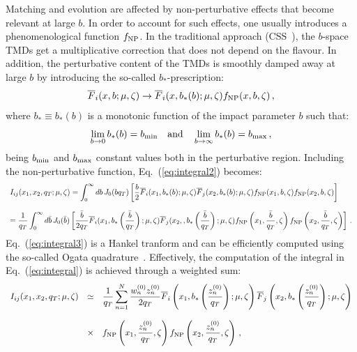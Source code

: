 \documentclass[10pt,a4paper]{article}
\begin{document}
Matching and evolution are affected by non-perturbative effects that
become relevant at large $b$. In order to account for such effects,
one usually introduces a phenomenological function $f_{\rm NP}$. In
the traditional approach (CSS~\cite{Collins:2011zzd}), the $b$-space
TMDs get a multiplicative correction that does not depend on the
flavour. In addition, the perturbative content of the TMDs is smoothly
damped away at large $b$ by introducing the so-called
$b_*$-prescription:
\begin{equation}\label{eq:LOconvNP1}
  \overline{F}_i(x,b;\mu,\zeta) \rightarrow \overline{F}_i(x,b_*(b);\mu,\zeta) f_{\rm NP}(x,b,\zeta)\,,
\end{equation}
where $b_*\equiv b_*(b)$ is a monotonic function of the impact
parameter $b$ such that:
\begin{equation}
  \lim_{b\rightarrow 0}
  b_*(b) = b_{\rm min}\quad\mbox{and}\quad\lim_{b\rightarrow \infty}
  b_*(b) = b_{\rm max}\,,
\end{equation}
being $b_{\rm min}$ and $b_{\rm max}$ constant values both in the
perturbative region. Including the non-perturbative function,
Eq.~(\ref{eq:integral2}) becomes:
\begin{equation}\label{eq:integral3}
\begin{array}{l}
\displaystyle I_{ij}(x_1,x_2,q_T;\mu,\zeta) = \displaystyle \int_0^\infty db\,J_0(bq_T)\left[\frac{b}2 
\overline{F}_i(x_1,b_*(b);\mu,\zeta) \overline{F}_{j}(x_2,b_*(b);\mu,\zeta) f_{\rm NP}(x_1,b,\zeta)
  f_{\rm NP}(x_2,b,\zeta) \right]\\
\\
\displaystyle =\frac{1}{q_T}\int_0^\infty d\bar{b}\,J_0(\bar{b})\left[\frac{\bar{b}}{2q_T} 
\overline{F}_i(x_1,b_*\left(\frac{\bar{b}}{q_T}\right);\mu,\zeta) \overline{F}_{j}(x_2,,b_*\left(\frac{\bar{b}}{q_T}\right);\mu,\zeta) f_{\rm NP}\left(x_1,\frac{\bar{b}}{q_T},\zeta\right)
  f_{\rm NP}\left(x_2,\frac{\bar{b}}{q_T},\zeta\right) \right]
\,.
\end{array}
\end{equation}
Eq.~(\ref{eq:integral3}) is a Hankel tranform and can be efficiently
computed using the so-called Ogata quadrature~\cite{Ogata:quadrature}.
Effectively, the computation of the integral in
Eq.~(\ref{eq:integral}) is achieved through a weighted sum:
\begin{equation}\label{eq:ogataquadrature}
\begin{array}{rcl}
I_{ij}(x_1,x_2,q_T;\mu,\zeta) &\simeq& \displaystyle
                                                     \frac1{q_T}\sum_{n=1}^N
                                                     \frac{w_n^{(0)}z_n^{(0)}}{2q_T} 
\overline{F}_i\left(x_1,b_*\left
                                       (\frac{z_n^{(0)}}{q_T}\right);\mu,\zeta\right) \overline{F}_j\left(x_2,b_*\left (\frac{z_n^{(0)}}{q_T}\right);\mu,\zeta\right)\\
\\
&\times&\displaystyle f_{\rm NP}\left(x_1,\frac{z_n^{(0)}}{q_T},\zeta\right)
  f_{\rm NP}\left(x_2,\frac{z_n^{(0)}}{q_T},\zeta\right)\,,
\end{array}
\end{equation}
\end{document}
